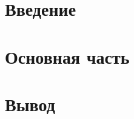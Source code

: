 \documentclass[utf8x, 12pt]{G7-32}
\begin{document}
\frontmatter %



\tableofcontents
\pagebreak


\part{Введение}
%
\pagebreak

\part{Основная часть}
\mainmatter %



\backmatter %
\part{Вывод}
%

\end{document}
